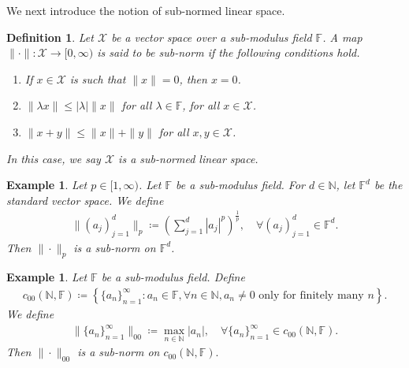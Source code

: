\documentclass{amsart}
\newtheorem{definition}[theorem]{Definition}
\newtheorem{example}[theorem]{Example}
\begin{document}
We next introduce the notion of sub-normed linear space.
\begin{definition}
	Let $\mathcal{X}$ be a vector space over a sub-modulus field $\mathbb{F}$. A map $\|\cdot\|: \mathcal{X}\to [0, \infty)$ is said to be sub-norm if the following conditions hold.	
	\begin{enumerate}[\upshape (i)]
		\item If $x \in \mathcal{X}$ is such that $\|x\| =0$, then $x=0$.
		\item $\|\lambda x\|\leq |\lambda|\|x\|$ for all $ \lambda \in \mathbb{F}$, for all $x \in \mathcal{X}$.
		\item $\|x+y\|\leq \|x\|+\|y\|$ for all $x,y \in \mathcal{X}$.
	\end{enumerate} 
	In this case, we say $\mathcal{X}$ is a sub-normed linear space. 
\end{definition}
\begin{example}
	Let $p\in [1, \infty)$.  Let $\mathbb{F}$ be a sub-modulus field. For $d \in \mathbb{N}$, let $\mathbb{F}^d$ be the standard vector space. We define 
	\begin{align*}
		\|(a_j)_{j=1}^d\|_p\coloneqq \left(\sum_{j=1}^{d}|a_j|^p\right)^\frac{1}{p}, \quad \forall (a_j)_{j=1}^d \in \mathbb{F}^d.
	\end{align*}
	Then $\|\cdot\|_p$ is a sub-norm on $\mathbb{F}^d$.
\end{example}
\begin{example}
	Let $\mathbb{F}$ be a sub-modulus field. Define 
	\begin{align*}
		c_{00}(\mathbb{N}, \mathbb{F})	\coloneqq\left\{\{a_n\}_{n=1}^\infty: a_n \in \mathbb{F}, \forall n \in \mathbb{N}, a_n \neq 0 \text{ only for finitely many } n\right\}. 
	\end{align*}
	We define 
	\begin{align*}
		\|\{a_n\}_{n=1}^\infty\|_{00}\coloneqq \max_{n\in \mathbb{N}}|a_n|, \quad \forall \{a_n\}_{n=1}^\infty\in c_{00}(\mathbb{N}, \mathbb{F}).
	\end{align*}
	Then $\|\cdot\|_{00}$ is a sub-norm on  $c_{00}(\mathbb{N}, \mathbb{F}).$	
\end{example}
\end{document}
